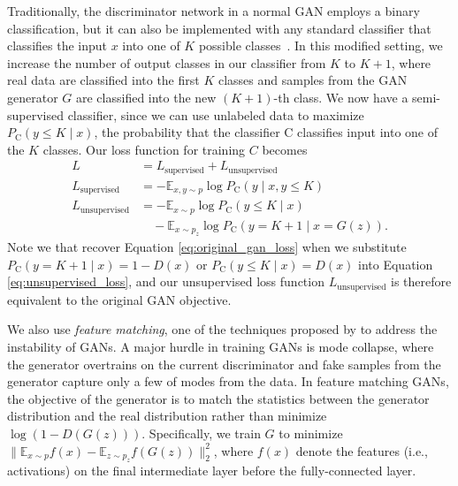 \documentclass[fleqn,usenatbib]{mnras}
\newcommand{\ie}{{i.e., }}
\begin{document}
Traditionally, the discriminator network in a normal GAN employs a binary classification,
but it can also be implemented with any standard classifier that classifies the input $x$
into one of $K$ possible classes~\citep{salimans2016improved, odena2016semi}.
In this modified setting, we increase the number of output classes in our classifier from $K$ to $K+1$,
where real data are classified into the first $K$ classes and samples from the GAN generator $G$ are
classified into the new $\left( K + 1 \right)$-th class.
We now have a semi-supervised classifier, since we can use unlabeled data to maximize
$P_{\mathrm{C}} \left( y \leq K \mid x \right)$,
the probability that the classifier $\mathrm{C}$ classifies input into one of the $K$ classes.
Our loss function for training $C$ becomes
\begin{align}
  L &= L_{\text{supervised}} + L_{\text{unsupervised}}
    \label{eq:total_loss} \\
  L_{\text{supervised}} &= -\mathbb{E}_{x, y \sim p} \log P_{\mathrm{C}} \left( y \mid x, y \leq K \right)
    \label{eq:supervised_loss} \\
  L_{\text{unsupervised}} &= - \mathbb{E}_{x \sim p} \log P_{\mathrm{C}} \left( y \leq K \mid x \right) \nonumber \\
    & \quad - \mathbb{E}_{x \sim p_z} \log P_{\mathrm{C}} \left( y = K + 1 \mid x = G \left( z \right) \right).
    \label{eq:unsupervised_loss}
\end{align}
Note we that recover Equation \ref{eq:original_gan_loss} when we substitute
$P_{\mathrm{C}} \left ( y = K + 1 \mid x \right) = 1 - D(x)$ or
$P_{\mathrm{C}} \left( y \leq K \mid x \right) = D(x)$ into Equation \ref{eq:unsupervised_loss},
and our unsupervised loss function $L_{\text{unsupervised}}$ is therefore equivalent to the original GAN objective.

We also use \textit{feature matching}, one of the techniques proposed by \citet{salimans2016improved} to address
the instability of GANs.
A major hurdle in training GANs is mode collapse, where the generator overtrains on the current discriminator
and fake samples from the generator capture only a few of modes from the data.
In feature matching GANs, the objective of the generator is to match the statistics between the generator distribution
and the real distribution rather than minimize $\log \left( 1 - D \left( G \left( z \right) \right) \right)$.
Specifically, we train $G$ to minimize
$ \big\lVert \mathbb{E}_{x \sim p} f \left( x \right) - \mathbb{E}_{z \sim p_z} f \left( G \left( z \right) \right) \big\rVert^2_2$,
where $f(x)$ denote the features (\ie activations) on the final intermediate layer before the fully-connected layer.
\end{document}
